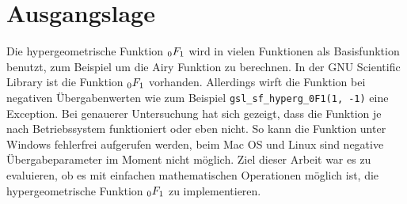 %
%
%
\section{Ausgangslage\label{0f1:section:ausgangslage}}
Die hypergeometrische Funktion $\mathstrut_0F_1$ wird in vielen Funktionen als Basisfunktion benutzt, 
zum Beispiel um die Airy Funktion zu berechnen. 
In der GNU Scientific Library \cite{0f1:library-gsl} 
ist die Funktion $\mathstrut_0F_1$ vorhanden. 
Allerdings wirft die Funktion bei negativen Übergabenwerten wie zum Beispiel \verb+gsl_sf_hyperg_0F1(1, -1)+ eine Exception. 
Bei genauerer Untersuchung hat sich gezeigt, dass die Funktion je nach Betriebssystem funktioniert oder eben nicht. 
So kann die Funktion unter Windows fehlerfrei aufgerufen werden, beim Mac OS und Linux sind negative Übergabeparameter im Moment nicht möglich.
Ziel dieser Arbeit war es zu evaluieren, ob es mit einfachen mathematischen Operationen möglich ist, die hypergeometrische Funktion $\mathstrut_0F_1$ zu implementieren.

